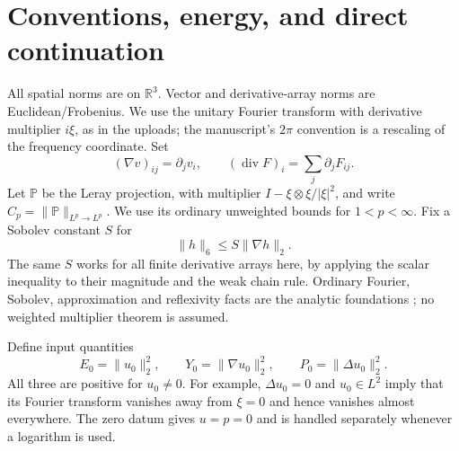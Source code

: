 \documentclass[11pt,a4paper]{article}
\theoremstyle{definition}\newtheorem{definition}[theorem]{Definition}
\theoremstyle{remark}\newtheorem{remark}[theorem]{Remark}
\newcommand{\R}{\mathbb R}
\newcommand{\PP}{\mathbb P}
\newcommand{\norm}[1]{\lVert #1\rVert}
\newcommand{\diver}{\operatorname{div}}
\numberwithin{equation}{section}
\begin{document}
\section{Conventions, energy, and direct continuation}
\label{sec:basic}
All spatial norms are on $\R^3$. Vector and derivative-array norms are Euclidean/Frobenius. We use the unitary Fourier transform with derivative multiplier $i\xi$, as in the uploads; the manuscript's $2\pi$ convention is a rescaling of the frequency coordinate. Set
\[
 (\nabla v)_{ij}=\partial_jv_i,\qquad
 (\diver F)_i=\sum_j\partial_jF_{ij}.
\]
Let $\PP$ be the Leray projection, with multiplier $I-\xi\otimes\xi/|\xi|^2$, and write $C_p=\norm{\PP}_{L^p\to L^p}$. We use its ordinary unweighted bounds for $1<p<\infty$. Fix a Sobolev constant $S$ for
\begin{equation}\label{eq:sob}
 \norm h_6\le S\norm{\nabla h}_2.
\end{equation}
The same $S$ works for all finite derivative arrays here, by applying the scalar inequality to their magnitude and the weak chain rule. Ordinary Fourier, Sobolev, approximation and reflexivity facts are the analytic foundations \cite{Stein,Brezis}; no weighted multiplier theorem is assumed.

Define input quantities
\begin{equation}\label{eq:inputs}
 E_0=\norm{u_0}_2^2,\qquad Y_0=\norm{\nabla u_0}_2^2,
 \qquad P_0=\norm{\Delta u_0}_2^2.
\end{equation}
All three are positive for $u_0\ne0$. For example, $\Delta u_0=0$ and $u_0\in L^2$ imply that its Fourier transform vanishes away from $\xi=0$ and hence vanishes almost everywhere. The zero datum gives $u=p=0$ and is handled separately whenever a logarithm is used.
\end{document}
